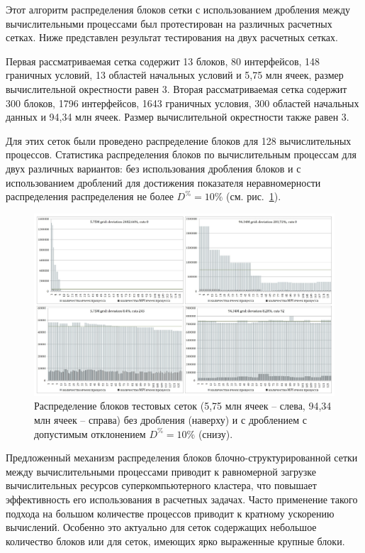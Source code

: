 Этот алгоритм распределения блоков сетки с использованием дробления между вычислительными процессами был протестирован на различных расчетных сетках.
Ниже представлен результат тестирования на двух расчетных сетках.

Первая рассматриваемая сетка содержит 13 блоков, 80 интерфейсов, 148 граничных условий, 13 областей начальных условий и 5,75 млн ячеек, размер вычислительной окрестности равен 3.
Вторая рассматриваемая сетка содержит 300 блоков, 1796 интерфейсов, 1643 граничных условия, 300 областей начальных данных и 94,34 млн ячеек.
Размер вычислительной окрестности также равен 3.

Для этих сеток были проведено распределение блоков для 128 вычислительных процессов.
Статистика распределения блоков по вычислительным процессам для двух различных вариантов: без использования дробления блоков и с использованием дроблений для достижения показателя неравномерности распределения распределения не более $D^{\%} = 10\%$ (см. рис.~\ref{fig:text_2_withcut_charts}).

\begin{figure}[ht]
\centering
\includegraphics[width=1.0\textwidth]{fig/par_withcut-charts.pdf}
\singlespacing
{}\caption{Распределение блоков тестовых сеток (5,75 млн ячеек -- слева, 94,34 млн ячеек -- справа) без дробления (наверху) и с дроблением с допустимым отклонением $D^{\%} = 10\%$ (снизу).}
\label{fig:text_2_withcut_charts}
\end{figure}

Предложенный механизм распределения блоков блочно-структурированной сетки между вычислительными процессами приводит к равномерной загрузке вычислительных ресурсов суперкомпьютерного кластера, что повышает эффективность его использования в расчетных задачах.
Часто применение такого подхода на большом количестве процессов приводит к кратному ускорению вычислений.
Особенно это актуально для сеток содержащих небольшое количество блоков или для сеток, имеющих ярко выраженные крупные блоки.

